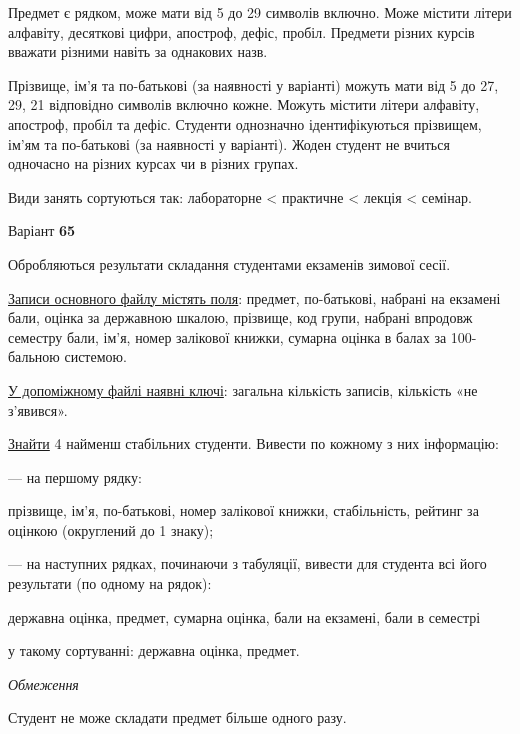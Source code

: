 \documentclass[11pt, ukrainian]{article}
\begin{document}
Предмет є рядком, може мати від 5 до 29 символів включно.
Може містити літери алфавіту, десяткові цифри, апостроф, дефіс, пробіл.
Предмети різних курсів вважати різними навіть за однакових назв.

Прізвище, ім’я та по-батькові (за наявності у варіанті)
можуть мати від 5 до 27, 29, 21 відповідно символів включно кожне.
Можуть містити літери алфавіту, апостроф, пробіл та дефіс.
Студенти однозначно ідентифікуються прізвищем, ім’ям та по-батькові (за наявності у варіанті).
Жоден студент не вчиться одночасно на різних курсах чи в різних групах.

Види занять сортуються так: лабораторне < практичне < лекція < семінар.





\par
\newpage
{\center Варіант  \No \textbf { 65 }\par}
\bigskip
Обробляються результати складання студентами екзаменів зимової сесії.

\underline{Записи основного файлу містять поля}: предмет, по-батькові, набрані на екзамені бали, оцінка за державною шкалою, прізвище, код групи, набрані впродовж семестру бали, ім’я, номер залікової книжки, сумарна оцінка в балах за 100-бальною системою.

\underline{У допоміжному файлі наявні ключі}: загальна кількість записів, кількість «не з’явився».

\underline{Знайти} 4 найменш стабільних студенти. Вивести по кожному з них інформацію:\par
{\noindent}--- на першому рядку:\par
прізвище, ім’я, по-батькові, номер залікової книжки, стабільність, рейтинг за оцінкою (округлений до 1 знаку);

{\noindent}--- на наступних рядках, починаючи з табуляції, вивести для студента всі його результати (по одному на рядок):\par
державна оцінка, предмет, сумарна оцінка, бали на екзамені, бали в семестрі

{\noindent}у такому сортуванні: державна оцінка, предмет.


\bigskip\textit{Обмеження}

Студент не може складати предмет більше одного разу.
\end{document}
